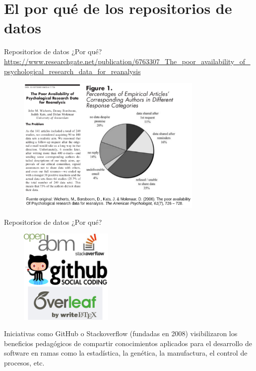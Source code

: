 \documentclass{beamer}
\begin{document}
\section{El por qué de los repositorios de datos}
\begin{frame}{Repositorios de datos ¿Por qué?}
\tiny{\textcolor{blue}{\url{https://www.researchgate.net/publication/6763307_The_poor_availability_of_psychological_research_data_for_reanalysis}}}
\begin{figure}
\centering
\includegraphics[width=0.8\textwidth]{psycdata}
\end{figure}
\end{frame}

\begin{frame}{Repositorios de datos ¿Por qué?}
\begin{figure}
\centering
\includegraphics[width=0.4\textwidth]{codingr}
\end{figure}
Iniciativas como GitHub o Stackoverflow (fundadas en 2008) visibilizaron los beneficios pedagógicos de compartir conocimientos aplicados para el  desarrollo de software en ramas como la estadística, la genética, la manufactura, el control de procesos, etc.
\end{frame}
\end{document}
